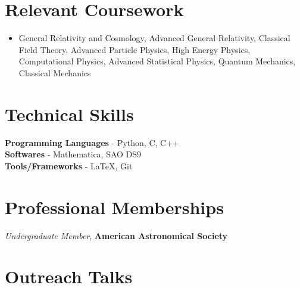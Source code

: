 \documentclass[margin, centered]{res}
\begin{document}
\begin{resume}





\section{Relevant Coursework}
\begin{itemize}[leftmargin=*]
    \item General Relativity and Cosmology, Advanced General Relativity, Classical Field Theory, Advanced Particle Physics, High Energy Physics, Computational Physics, Advanced Statistical Physics, Quantum Mechanics, Classical Mechanics
\end{itemize}



\section{Technical \hspace{2mm} Skills}
\textbf{Programming Languages} - Python, C, C++\\
\textbf{Softwares} - Mathematica, SAO DS9 \\
\textbf{Tools/Frameworks} - \LaTeX, Git

\section{Professional Memberships}
\textit{Undergraduate Member}, \textbf{American Astronomical Society}\\

\section{Outreach Talks}



\end{resume}
\end{document}
